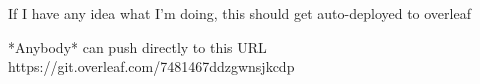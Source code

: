\documentclass{article}
\begin{document}
If I have any idea what I'm doing, this should get auto-deployed to overleaf

*Anybody* can push directly to this URL https://git.overleaf.com/7481467ddzgwnsjkcdp
\end{document}
